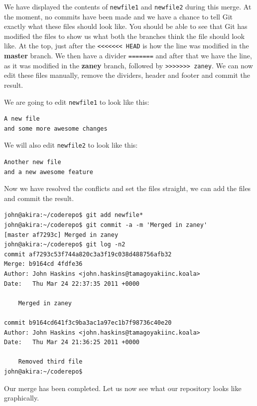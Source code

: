 We have displayed the contents of \texttt{newfile1} and \texttt{newfile2} during this merge.  At the moment, no commits have been made and we have a chance to tell Git exactly what these files should look like.  You should be able to see that Git has modified the files to show us what both the branches think the file should look like.  At the top, just after the \texttt{<<<<<<< HEAD} is how the line was modified in the \textbf{master} branch.  We then have a divider \texttt{=======} and after that we have the line, as it was modified in the \textbf{zaney} branch, followed by \texttt{>>>>>>> zaney}.  We can now edit these files manually, remove the dividers, header and footer and commit the result.  

We are going to edit \texttt{newfile1} to look like this:

\begin{Verbatim}[frame=leftline,framerule=1mm,fontsize=\relsize{-3}] 
A new file
and some more awesome changes
\end{Verbatim}

We will also edit \texttt{newfile2} to look like this:

\begin{Verbatim}[frame=leftline,framerule=1mm,fontsize=\relsize{-3}] 
Another new file
and a new awesome feature
\end{Verbatim}

Now we have resolved the conflicts and set the files straight, we can add the files and commit the result.

\begin{Verbatim}[frame=leftline,framerule=1mm,fontsize=\relsize{-3}] 
john@akira:~/coderepo$ git add newfile*
john@akira:~/coderepo$ git commit -a -m 'Merged in zaney'
[master af7293c] Merged in zaney
john@akira:~/coderepo$ git log -n2
commit af7293c53f744a820c3a3f19c038d488756afb32
Merge: b9164cd 4fdfe36
Author: John Haskins <john.haskins@tamagoyakiinc.koala>
Date:   Thu Mar 24 22:37:35 2011 +0000

    Merged in zaney

commit b9164cd641f3c9ba3ac1a97ec1b7f98736c40e20
Author: John Haskins <john.haskins@tamagoyakiinc.koala>
Date:   Thu Mar 24 21:36:25 2011 +0000

    Removed third file
john@akira:~/coderepo$ 

\end{Verbatim}

Our merge has been completed.  Let us now see what our repository looks like graphically.

